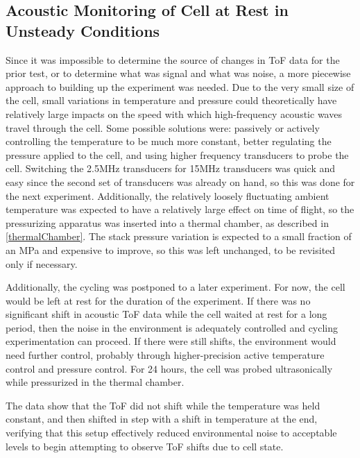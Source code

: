 \subsection{Acoustic Monitoring of Cell at Rest in Unsteady Conditions}\label{chamberTest}
Since it was impossible to determine the source of changes in ToF data for the prior test, or to determine what was signal and what was noise, a more piecewise approach to building up the experiment was needed. Due to the very small size of the cell, small variations in temperature and pressure could theoretically have relatively large impacts on the speed with which high-frequency acoustic waves travel through the cell. Some possible solutions were: passively or actively controlling the temperature to be much more constant, better regulating the pressure applied to the cell, and using higher frequency transducers to probe the cell. Switching the 2.5MHz transducers for 15MHz transducers was quick and easy since the second set of transducers was already on hand, so this was done for the next experiment. Additionally, the relatively loosely fluctuating ambient temperature was expected to have a relatively large effect on time of flight, so the pressurizing apparatus was inserted into a thermal chamber, as described in \hyperref[thermalChamber]{\cref{thermalChamber}}. The stack pressure variation is expected to a small fraction of an MPa and expensive to improve, so this was left unchanged, to be revisited only if necessary.

Additionally, the cycling was postponed to a later experiment.
For now, the cell would be left at rest for the duration of the experiment. 
If there was no significant shift in acoustic ToF data while the cell waited at rest for a long period, then the noise in the environment is adequately controlled and cycling experimentation can proceed. 
If there were still shifts, the environment would need further control, probably through higher-precision active temperature control and pressure control. 
For 24 hours, the cell was probed ultrasonically while pressurized in the thermal chamber.

The data show that the ToF did not shift while the temperature was held constant, and then shifted in step with a shift in temperature at the end, verifying that this setup effectively reduced environmental noise to acceptable levels to begin attempting to observe ToF shifts due to cell state.

